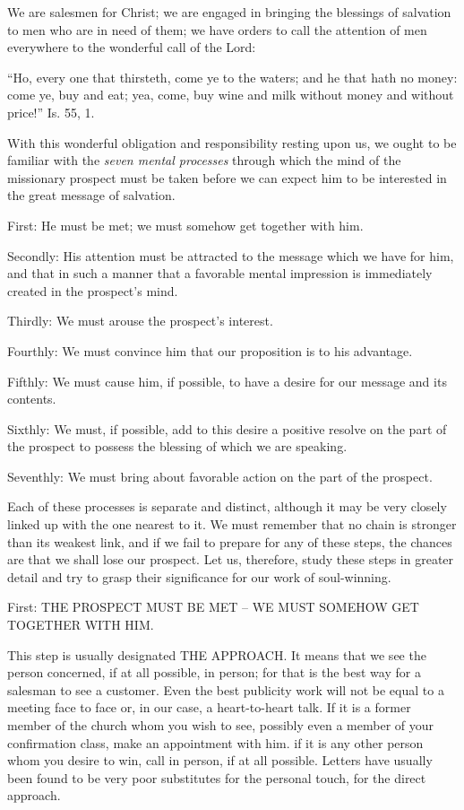 \documentclass[
]{book}
\begin{document}
We are salesmen for Christ; we are engaged in bringing the blessings of salvation to men who are in need of them; we have orders to call the attention of men everywhere to the wonderful call of the Lord:

``Ho, every one that thirsteth, come ye to the waters; and he that hath no money: come ye, buy and eat; yea, come, buy wine and milk without money and without price!'' Is. 55, 1.

With this wonderful obligation and responsibility resting upon us, we ought to be familiar with the \emph{seven mental processes} through which the mind of the missionary prospect must be taken before we can expect him to be interested in the great message of salvation.

First: He must be met; we must somehow get together with him.

Secondly: His attention must be attracted to the message which we have for him, and that in such a manner that a favorable mental impression is immediately created in the prospect's mind.

Thirdly: We must arouse the prospect's interest.

Fourthly: We must convince him that our proposition is to his advantage.

Fifthly: We must cause him, if possible, to have a desire for our message and its contents.

Sixthly: We must, if possible, add to this desire a positive resolve on the part of the prospect to possess the blessing of which we are speaking.

Seventhly: We must bring about favorable action on the part of the prospect.

Each of these processes is separate and distinct, although it may be very closely linked up with the one nearest to it. We must remember that no chain is stronger than its weakest link, and if we fail to prepare for any of these steps, the chances are that we shall lose our prospect. Let us, therefore, study these steps in greater detail and try to grasp their significance for our work of soul-winning.

First: THE PROSPECT MUST BE MET -- WE MUST SOMEHOW GET TOGETHER WITH HIM.

This step is usually designated THE APPROACH. It means that we see the person concerned, if at all possible, in person; for that is the best way for a salesman to see a customer. Even the best publicity work will not be equal to a meeting face to face or, in our case, a heart-to-heart talk. If it is a former member of the church whom you wish to see, possibly even a member of your confirmation class, make an appointment with him. if it is any other person whom you desire to win, call in person, if at all possible. Letters have usually been found to be very poor substitutes for the personal touch, for the direct approach.
\end{document}
